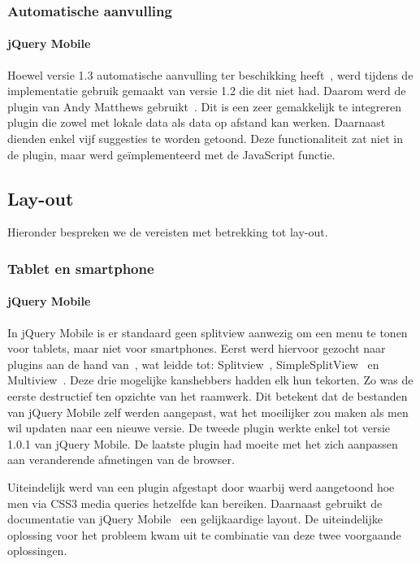 \subsubsection{Automatische aanvulling}

\paragraph{jQuery Mobile} 
Hoewel versie 1.3 automatische aanvulling ter beschikking heeft~\cite{JQuery2013c}, werd tijdens de implementatie gebruik gemaakt van versie 1.2 die dit niet had. Daarom werd de plugin van Andy Matthews gebruikt~\cite{Matthews2013}. Dit is een zeer gemakkelijk te integreren plugin die zowel met lokale data als data op afstand kan werken. Daarnaast dienden enkel vijf suggesties te worden getoond. Deze functionaliteit zat niet in de plugin, maar werd geïmplementeerd met de JavaScript  functie.

\subsection{Lay-out}
Hieronder bespreken we de vereisten met betrekking tot lay-out.

\subsubsection{Tablet en smartphone}

\paragraph{jQuery Mobile} 
In jQuery Mobile is er standaard geen splitview aanwezig om een menu te tonen voor tablets, maar niet voor smartphones. Eerst werd hiervoor gezocht naar plugins aan de hand van~\cite{Deering2012}, wat leidde tot: Splitview~\cite{Rahman2013}, SimpleSplitView~\cite{Yared2013} en Multiview~\cite{Franck2012}. Deze drie mogelijke kanshebbers hadden elk hun tekorten. Zo was de eerste destructief ten opzichte van het raamwerk. Dit betekent dat de bestanden van jQuery Mobile zelf werden aangepast, wat het moeilijker zou maken als men wil updaten naar een nieuwe versie. De tweede plugin werkte enkel tot versie 1.0.1 van jQuery Mobile. De laatste plugin had moeite met het zich  aanpassen aan veranderende afmetingen van de browser. 

Uiteindelijk werd van een plugin afgestapt door \cite{Hadlock2012} waarbij werd aangetoond hoe men via CSS3 media queries hetzelfde kan bereiken. Daarnaast gebruikt de documentatie van jQuery Mobile~\cite{JQuery2012b} een gelijkaardige layout. De uiteindelijke oplossing voor het probleem kwam uit te combinatie van deze twee voorgaande oplossingen.

